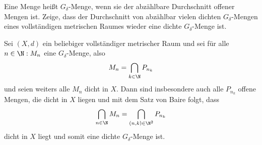 \begin{exercise}
Eine Menge heißt $G_{\delta}$-Menge, wenn sie der abzählbare Durchschnitt offener
Mengen ist. Zeige, dass der Durchschnitt von abzählbar vielen dichten $G_{\delta}$-Mengen
eines vollständigen metrischen Raumes wieder eine dichte $G_{\delta}$-Menge ist.
\end{exercise}
\begin{solution}
Sei $(X,d)$ ein beliebiger vollständiger metrischer Raum und sei für alle $n \in \N: M_n$
eine $G_{\delta}$-Menge, also
\begin{align*}
  M_n = \bigcap_{k \in \N}P_{n_k}
\end{align*}
und seien weiters alle $M_n$ dicht in $X$. Dann sind insbesondere auch alle $P_{n_k}$
offene Mengen, die dicht in $X$ liegen und mit dem Satz von Baire folgt, dass
\begin{align*}
  \bigcap_{n \in \N}M_n = \bigcap_{(n,k) \in \N^2}P_{n_k}
\end{align*}
dicht in $X$ liegt und somit eine dichte $G_{\delta}$-Menge ist.
\end{solution}
